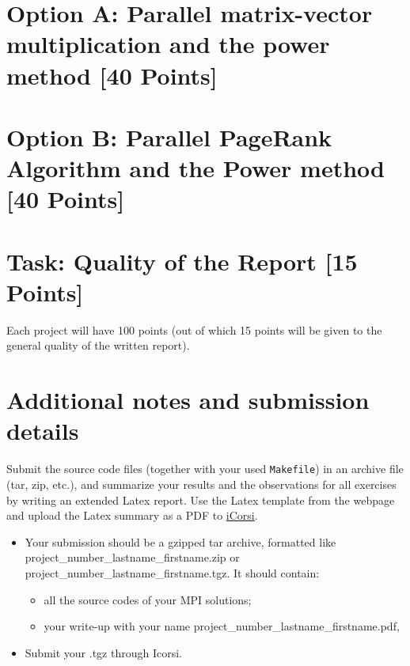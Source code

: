 \documentclass[unicode,11pt,a4paper,oneside,numbers=endperiod,openany]{scrartcl}
\begin{document}
\section{Option A: Parallel matrix-vector multiplication and the power method [40 Points]}





\section{Option B: Parallel PageRank Algorithm and the Power method  [40 Points]}



\section{Task:  Quality of the Report [15 Points]}
Each project will have 100 points (out of  which 15 points will be given to
the general quality of the written report).



\section*{Additional notes and submission details}
Submit the source code files (together with your used \texttt{Makefile}) in
an archive file (tar, zip, etc.), and summarize your results and the
observations for all exercises by writing an extended Latex report.
Use the Latex template from the webpage and upload the Latex summary
as a PDF to \href{https://www.icorsi.ch/course/view.php?id=14652}{iCorsi}.

\begin{itemize}
\item Your submission should be a gzipped tar archive, formatted like project\_number\_lastname\_firstname.zip or project\_number\_lastname\_firstname.tgz. 
      It should contain:
  \begin{itemize}
    \item all the source codes of your MPI solutions;
    \item your write-up with your name  project\_number\_lastname\_firstname.pdf,
  \end{itemize}
   \item Submit your .tgz through Icorsi.
  \end{itemize}
\end{document}

